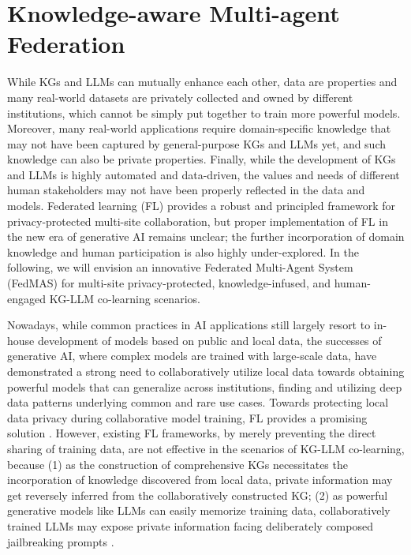 \section{Knowledge-aware Multi-agent Federation}
While KGs and LLMs can mutually enhance each other, data are properties and many real-world datasets are privately collected and owned by different institutions, which cannot be simply put together to train more powerful models. 
Moreover, many real-world applications require domain-specific knowledge that may not have been captured by general-purpose KGs and LLMs yet, and such knowledge can also be private properties. 
Finally, while the development of KGs and LLMs is highly automated and data-driven, the values and needs of different human stakeholders may not have been properly reflected in the data and models. 
Federated learning (FL) provides a robust and principled framework for privacy-protected multi-site collaboration, but proper implementation of FL in the new era of generative AI remains unclear; the further incorporation of domain knowledge and human participation is also highly under-explored. In the following, we will envision an innovative Federated Multi-Agent System (FedMAS) for multi-site privacy-protected, knowledge-infused, and human-engaged KG-LLM co-learning scenarios. 


Nowadays, while common practices in AI applications still largely resort to in-house development of models based on public and local data, the successes of generative AI, where complex models are trained with large-scale data, have demonstrated a strong need to collaboratively utilize local data towards obtaining powerful models that can generalize across institutions, finding and utilizing deep data patterns underlying common and rare use cases. Towards protecting local data privacy during collaborative model training, FL provides a promising solution \cite{nguyen2022federated, antunes2022federated, nguyen2022federated, antunes2022federated, xu2021federated, rieke2020future}. However, existing FL frameworks, by merely preventing the direct sharing of training data, are not effective in the scenarios of KG-LLM co-learning, because (1) as the construction of comprehensive KGs necessitates the incorporation of knowledge discovered from local data, private information may get reversely inferred from the collaboratively constructed KG; (2) as powerful generative models like LLMs can easily memorize training data, collaboratively trained LLMs may expose private information facing deliberately composed jailbreaking prompts \cite{wei2024jailbroken, wang2023decodingtrust, xu2024llm}.


